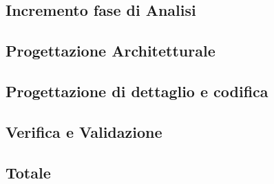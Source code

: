 \subsection{Incremento fase di Analisi}
\subsection{Progettazione Architetturale}
\subsection{Progettazione di dettaglio e codifica}
\subsection{Verifica e Validazione}
\subsection{Totale}






